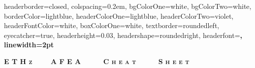 \documentclass[landscape,a0paper,fontscale=0.285]{baposter} %
\begin{document}
\begin{poster}
{
headerborder=closed, %
colspacing=0.2em, %
bgColorOne=white, %
bgColorTwo=white, %
borderColor=lightblue, %
headerColorOne=lightblue, %
headerColorTwo=violet, %
headerFontColor=white, %
boxColorOne=white, %
textborder=roundedleft, %
eyecatcher=true, %
headerheight=0.03\textheight, %
headershape=roundedright, %
headerfont=\Large\bf\textsc, %
linewidth=2pt %
}

{\bf\textsc{E T H z \ \ \ \ A F E A \ \ \ \ \ C h e a t \ \ \ \ \ S h e e t }\vspace{0.0em}} %
{}

\end{poster}
\end{document}
